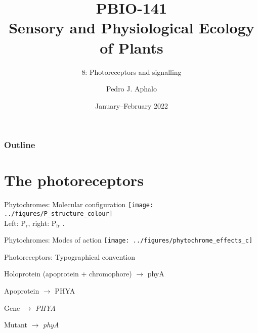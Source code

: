 \documentclass[10pt]{beamer}
\begin{document}
\title{PBIO-141\\Sensory and Physiological Ecology\\of  Plants}
\subtitle{8: Photoreceptors and signalling}
\author{Pedro J. Aphalo}
\date{January--February 2022}


  \begin{frame}
    \maketitle
  \end{frame}



  \begin{frame}
    \frametitle{Outline}
    \tableofcontents
  \end{frame}

\section{The photoreceptors}

\begin{frame}{Phytochromes: Molecular configuration}
    \centering
    \texttt{[image: ../figures/P\_structure\_colour]}\\
    {\small Left: P$_\mathrm{r}$, right: P$_\mathrm{fr}$ \autocite[from][]{Mohr1995}.}
\end{frame}

\begin{frame}{Phytochromes: Modes of action}
    \centering
    \texttt{[image: ../figures/phytochrome\_effects\_c]}
\end{frame}

\begin{frame}{Photoreceptors: Typographical convention}
    \begin{description}
        \item Holoprotein (apoprotein + chromophore) $\rightarrow$ phyA
        \item Apoprotein $\rightarrow$ PHYA
        \item Gene $\rightarrow$ \textsl{PHYA}
        \item Mutant $\rightarrow$ \textsl{phyA}
    \end{description}
\end{frame}
\end{document}
